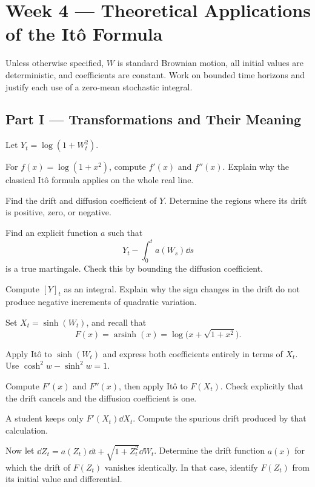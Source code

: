 \section{Week 4 --- Theoretical Applications of the It\^o Formula}

Unless otherwise specified, \(W\) is standard Brownian motion, all initial
values are deterministic, and coefficients are constant. Work on bounded
time horizons and justify each use of a zero-mean stochastic integral.

\subsection*{Part I --- Transformations and Their Meaning}

\begin{exercise}
Let \(Y_t=\log(1+W_t^2)\).
\begin{exparts}
  \item For \(f(x)=\log(1+x^2)\), compute \(f'(x)\) and \(f''(x)\).
  Explain why the classical It\^o formula applies on the whole real line.
  \item Find the drift and diffusion coefficient of \(Y\).
  Determine the regions where its drift is positive, zero, or negative.
  \item Find an explicit function \(a\) such that
  \[
  Y_t-\int_0^t a(W_s)\dd s
  \]
  is a true martingale. Check this by bounding the diffusion coefficient.
  \item Compute \([Y]_t\) as an integral. Explain why the sign changes
  in the drift do not produce negative increments of quadratic variation.
\end{exparts}
\end{exercise}

\begin{exercise}
Set \(X_t=\sinh(W_t)\), and recall that
\[
F(x)=\operatorname{arsinh}(x)=\log\bigl(x+\sqrt{1+x^2}\bigr).
\]
\begin{exparts}
  \item Apply It\^o to \(\sinh(W_t)\) and express both coefficients
  entirely in terms of \(X_t\). Use \(\cosh^2 w-\sinh^2 w=1\).
  \item Compute \(F'(x)\) and \(F''(x)\), then apply It\^o to
  \(F(X_t)\). Check explicitly that the drift cancels and the diffusion
  coefficient is one.
  \item A student keeps only \(F'(X_t)\dd X_t\). Compute the spurious
  drift produced by that calculation.
  \item Now let \(\dd Z_t=a(Z_t)\dd t+\sqrt{1+Z_t^2}\dd W_t\).
  Determine the drift function \(a(x)\) for which the drift of
  \(F(Z_t)\) vanishes identically. In that case, identify \(F(Z_t)\)
  from its initial value and differential.
\end{exparts}
\end{exercise}

